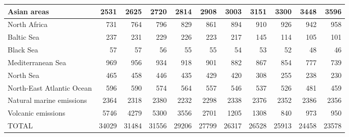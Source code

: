\begin{table}
\begin{tabular}{|l|r|r|r|r|r|r|r|r|r|r|}
                   Asian areas&   2531&   2625&   2720&   2814&   2908&   3003&   3151&   3300&   3448&   3596\\\hline
                  North Africa&    731&    764&    796&    829&    861&    894&    910&    926&    942&    958\\\hline
                    Baltic Sea&    237&    231&    229&    226&    223&    217&    145&    114&    105&    101\\\hline
                     Black Sea&     57&     57&     56&     55&     55&     54&     53&     52&     48&     46\\\hline
             Mediterranean Sea&    969&    956&    934&    918&    901&    882&    867&    854&    777&    739\\\hline
                     North Sea&    465&    458&    446&    435&    429&    420&    308&    255&    238&    230\\\hline
     North-East Atlantic Ocean&    596&    590&    574&    564&    557&    546&    537&    526&    481&    459\\\hline
      Natural marine emissions&   2364&   2318&   2380&   2232&   2298&   2338&   2376&   2352&   2386&   2356\\\hline
            Volcanic emissions&   5746&   4279&   5300&   3556&   2701&   1205&   1308&    840&    973&    950\\\hline\hline
                         TOTAL&  34029&  31484&  31556&  29206&  27799&  26317&  26528&  25913&  24458&  23578\\\hline
 \end{tabular}
 \end{table}
 
